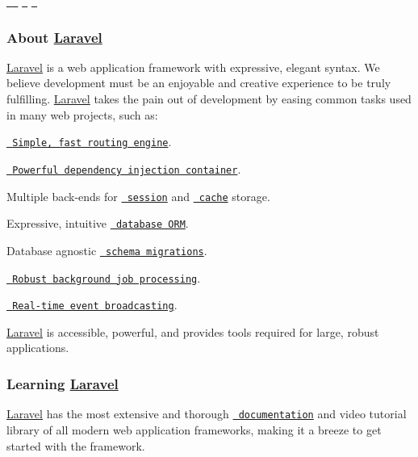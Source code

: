 

\href{https://travis-ci.org/laravel/framework}{\texttt{ }} \href{https://packagist.org/packages/laravel/framework}{\texttt{ }} \href{https://packagist.org/packages/laravel/framework}{\texttt{ }} \href{https://packagist.org/packages/laravel/framework}{\texttt{ }} 

\subsubsection*{About \mbox{\hyperlink{a00008}{Laravel}}}

\mbox{\hyperlink{a00008}{Laravel}} is a web application framework with expressive, elegant syntax. We believe development must be an enjoyable and creative experience to be truly fulfilling. \mbox{\hyperlink{a00008}{Laravel}} takes the pain out of development by easing common tasks used in many web projects, such as\+:


\begin{DoxyItemize}
\item \href{https://laravel.com/docs/routing}{\texttt{ Simple, fast routing engine}}.
\item \href{https://laravel.com/docs/container}{\texttt{ Powerful dependency injection container}}.
\item Multiple back-\/ends for \href{https://laravel.com/docs/session}{\texttt{ session}} and \href{https://laravel.com/docs/cache}{\texttt{ cache}} storage.
\item Expressive, intuitive \href{https://laravel.com/docs/eloquent}{\texttt{ database O\+RM}}.
\item Database agnostic \href{https://laravel.com/docs/migrations}{\texttt{ schema migrations}}.
\item \href{https://laravel.com/docs/queues}{\texttt{ Robust background job processing}}.
\item \href{https://laravel.com/docs/broadcasting}{\texttt{ Real-\/time event broadcasting}}.
\end{DoxyItemize}

\mbox{\hyperlink{a00008}{Laravel}} is accessible, powerful, and provides tools required for large, robust applications.

\subsubsection*{Learning \mbox{\hyperlink{a00008}{Laravel}}}

\mbox{\hyperlink{a00008}{Laravel}} has the most extensive and thorough \href{https://laravel.com/docs}{\texttt{ documentation}} and video tutorial library of all modern web application frameworks, making it a breeze to get started with the framework.

